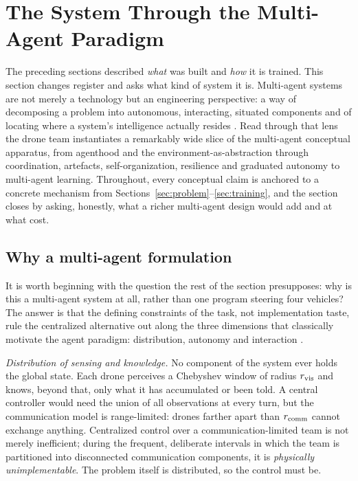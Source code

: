\section{The System Through the Multi-Agent Paradigm}
\label{sec:mas}

The preceding sections described \emph{what} was built and \emph{how} it is
trained. This section changes register and asks what kind of system it is.
Multi-agent systems are not merely a technology but an engineering perspective:
a way of decomposing a problem into autonomous, interacting, situated components
and of locating where a system's intelligence actually resides
\citep{jennings2001agent,wooldridge2009introduction}. Read through that lens the
drone team instantiates a remarkably wide slice of the multi-agent conceptual
apparatus, from agenthood and the environment-as-abstraction through
coordination, artefacts, self-organization, resilience and graduated autonomy to
multi-agent learning. Throughout, every conceptual claim is anchored to a
concrete mechanism from Sections~\ref{sec:problem}--\ref{sec:training}, and the
section closes by asking, honestly, what a richer multi-agent design would add
and at what cost.

\subsection{Why a multi-agent formulation}
\label{subsec:mas-why}

It is worth beginning with the question the rest of the section presupposes: why
is this a multi-agent system at all, rather than one program steering four
vehicles? The answer is that the defining constraints of the task, not
implementation taste, rule the centralized alternative out along the three
dimensions that classically motivate the agent paradigm: distribution, autonomy
and interaction \citep{jennings2001agent,zambonelli2003signs}.

\emph{Distribution of sensing and knowledge.} No component of the system ever
holds the global state. Each drone perceives a Chebyshev window of radius
$r_{\mathrm{vis}}$ and knows, beyond that, only what it has accumulated or been told. A
central controller would need the union of all observations at every turn, but
the communication model is range-limited: drones farther apart than $r_{\mathrm{comm}}$
cannot exchange anything. Centralized control over a communication-limited team
is not merely inefficient; during the frequent, deliberate intervals in which the
team is partitioned into disconnected communication components, it is
\emph{physically unimplementable}. The problem itself is distributed, so the
control must be.

